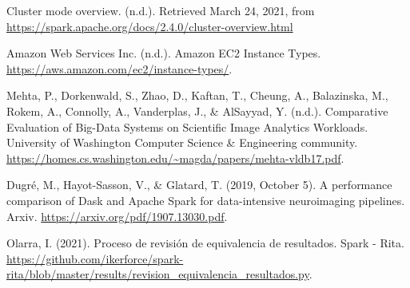 \documentclass[11pt, oneside]{book}
\begin{document}
\begin{thebibliography}{111}
 Cluster mode overview. (n.d.). Retrieved March 24, 2021, from \url{https://spark.apache.org/docs/2.4.0/cluster-overview.html}


 Amazon Web Services Inc. (n.d.). Amazon EC2 Instance Types.  \url{https://aws.amazon.com/ec2/instance-types/}.

 Mehta, P., Dorkenwald, S., Zhao, D., Kaftan, T., Cheung, A., Balazinska, M., Rokem, A., Connolly, A., Vanderplas, J.,  \& AlSayyad, Y. (n.d.). Comparative Evaluation of Big-Data Systems on Scientific Image Analytics Workloads. University of Washington Computer Science \& Engineering community. \url{https://homes.cs.washington.edu/~magda/papers/mehta-vldb17.pdf}. 

 Dugré, M., Hayot-Sasson, V., \& Glatard, T. (2019, October 5). A performance comparison of Dask and Apache Spark for data-intensive neuroimaging pipelines. Arxiv. \url{https://arxiv.org/pdf/1907.13030.pdf}.

 Olarra, I. (2021). Proceso de revisión de equivalencia de resultados. Spark - Rita. \url{https://github.com/ikerforce/spark-rita/blob/master/results/revision_equivalencia_resultados.py}. 



























\end{thebibliography}
\end{document}
